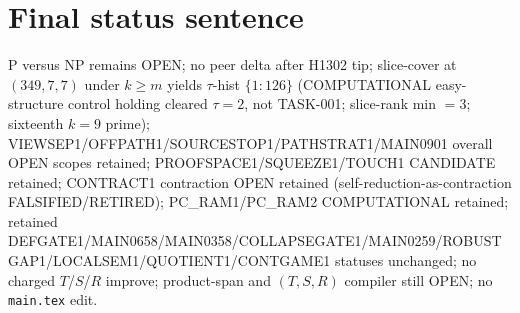 \documentclass[11pt]{article}
\begin{document}
\section*{Final status sentence}
P versus NP remains OPEN; no peer delta after H1302 tip; slice-cover at $(349,7,7)$ under $k{\ge}m$ yields $\tau$-hist $\{1{:}126\}$ (COMPUTATIONAL easy-structure control holding cleared $\tau{=}2$, not TASK-001; slice-rank min $=3$; sixteenth $k{=}9$ prime); VIEWSEP1/OFFPATH1/SOURCESTOP1/PATHSTRAT1/MAIN0901 overall OPEN scopes retained; PROOFSPACE1/SQUEEZE1/TOUCH1 CANDIDATE retained; CONTRACT1 contraction OPEN retained (self-reduction-as-contraction FALSIFIED/RETIRED); PC\_RAM1/PC\_RAM2 COMPUTATIONAL retained; retained DEFGATE1/MAIN0658/MAIN0358/COLLAPSEGATE1/MAIN0259/ROBUSTGAP1/LOCALSEM1/QUOTIENT1/CONTGAME1 statuses unchanged; no charged $T$/$S$/$R$ improve; product-span and $(T,S,R)$ compiler still OPEN; no \texttt{main.tex} edit.
\end{document}
